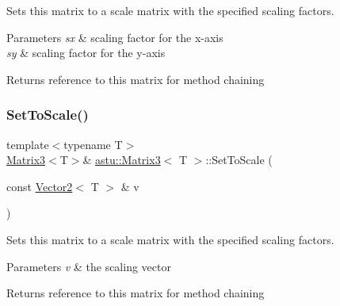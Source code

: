 Sets this matrix to a scale matrix with the specified scaling factors.


\begin{DoxyParams}{Parameters}
{\em sx} & scaling factor for the x-\/axis \\
\hline
{\em sy} & scaling factor for the y-\/axis \\
\hline
\end{DoxyParams}
\begin{DoxyReturn}{Returns}
reference to this matrix for method chaining 
\end{DoxyReturn}
\mbox{\label{classastu_1_1Matrix3_aab4690e7e0896d86726b982095b6a603}} 
\subsubsection{\texorpdfstring{Set\+To\+Scale()}{SetToScale()}\hspace{0.1cm}{\footnotesize\ttfamily [2/2]}}
{\footnotesize\ttfamily template$<$typename T$>$ \\
\hyperlink{classastu_1_1Matrix3}{Matrix3}$<$T$>$\& \hyperlink{classastu_1_1Matrix3}{astu\+::\+Matrix3}$<$ T $>$\+::Set\+To\+Scale (\begin{DoxyParamCaption}\item[{const \hyperlink{classastu_1_1Vector2}{Vector2}$<$ T $>$ \&}]{v }\end{DoxyParamCaption})\hspace{0.3cm}{\ttfamily [inline]}}

Sets this matrix to a scale matrix with the specified scaling factors.


\begin{DoxyParams}{Parameters}
{\em v} & the scaling vector \\
\hline
\end{DoxyParams}
\begin{DoxyReturn}{Returns}
reference to this matrix for method chaining 
\end{DoxyReturn}
\mbox{\label{classastu_1_1Matrix3_a670c75846f8edc570d19186226e8f0a6}} 
